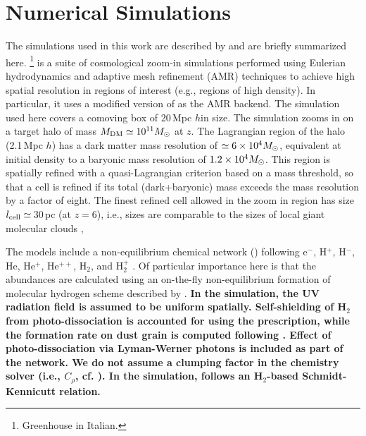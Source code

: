 \IfFileExists{emulateapjlegacy.cls}{\documentclass[iop]{emulateapjlegacy}}{\documentclass[iop]{emulateapj}}
\begin{document}
\section{Numerical Simulations}\label{sec:sim}
The simulations used in this work are described by \citet{Pallottini17a, Pallottini17b} and are briefly summarized here.
%
\footnote{Greenhouse in Italian.} is a suite of cosmological zoom-in simulations performed using Eulerian hydrodynamics and adaptive mesh refinement (AMR) techniques to achieve high spatial resolution in regions of interest (e.g., regions of high density).
%
In particular, it uses a modified version of  \citep{Teyssier02a} as the AMR backend. The simulation used here covers a comoving box of 20\,Mpc $h$\pmOne in size. The simulation zooms in on a target halo of mass $M_{\rm DM}\simeq10^{11} \mbox{$M_{\odot}$}$
at {\bf $z$}. The Lagrangian region of the halo (2.1\,Mpc $h$\pmOne) has a dark matter mass resolution of $\simeq 6\times 10^4 \mbox{$M_{\odot}$}$, equivalent at initial density to a baryonic mass resolution of $1.2 \times 10^4 \mbox{$M_{\odot}$}$. This region is spatially refined with a quasi-Lagrangian criterion based on a mass threshold, so that a cell is refined if its total (dark+baryonic) mass exceeds the mass resolution by a factor of eight. The finest refined cell allowed in the zoom in region has size $l_{\rm cell}\simeq$\,30\,pc (at $z = 6$), i.e., sizes are comparable to the sizes of local giant molecular clouds \citep[e.g.,][]{Sanders85a, Federrath13a, Goodman14a},

The models include a non-equilibrium chemical network () following e$^{-}$, H$^+$, H$^-$, He, He$^+$, He$^{++}$, H$_2$,
and H$_2^+$ \citep{Grassi14a,Bovino16a}. Of particular importance here is that the abundances are calculated using an on-the-fly non-equilibrium
formation of molecular hydrogen scheme described by \citet{Pallottini17a}.
{\bf In the simulation, the UV radiation field is assumed to be uniform spatially.
Self-shielding of H$_2$ from photo-dissociation is accounted for using the \citet{Richings14a} prescription,
while the formation rate on dust grain is computed following \citet{Jura75a}. Effect of photo-dissociation via Lyman-Werner photons is included as
part of the  network. %
We do not assume a clumping factor in the chemistry solver (i.e., $C_\rho$, cf. \citealt[][]{Lupi20a}).
In the simulation, \SF follows an H$_2$-based Schmidt-Kennicutt relation.}
\end{document}
